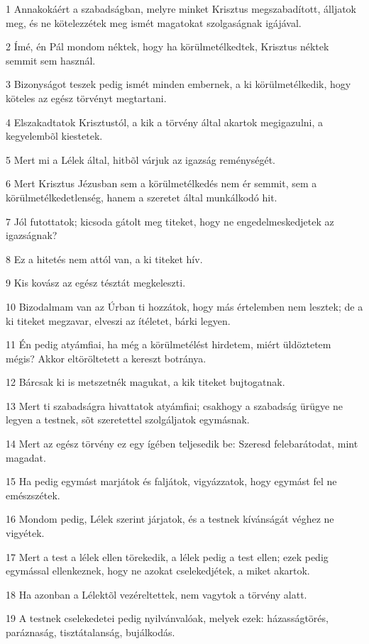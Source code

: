 \par 1 Annakokáért a szabadságban, melyre minket Krisztus megszabadított, álljatok meg, és ne kötelezzétek meg ismét magatokat szolgaságnak igájával.
\par 2 Ímé, én Pál mondom néktek, hogy ha körülmetélkedtek, Krisztus néktek semmit sem használ.
\par 3 Bizonyságot teszek pedig ismét minden embernek, a ki körülmetélkedik, hogy köteles az egész törvényt megtartani.
\par 4 Elszakadtatok Krisztustól, a kik a törvény által akartok megigazulni, a kegyelembõl kiestetek.
\par 5 Mert mi a Lélek által, hitbõl várjuk az igazság reménységét.
\par 6 Mert Krisztus Jézusban sem a körülmetélkedés nem ér semmit, sem a körülmetélkedetlenség, hanem a szeretet által munkálkodó  hit.
\par 7 Jól futottatok; kicsoda gátolt meg titeket, hogy ne engedelmeskedjetek az igazságnak?
\par 8 Ez a hitetés nem attól van, a ki titeket hív.
\par 9 Kis kovász az egész tésztát megkeleszti.
\par 10 Bizodalmam van az Úrban ti hozzátok, hogy más értelemben nem lesztek; de a ki titeket megzavar, elveszi az ítéletet, bárki legyen.
\par 11 Én pedig atyámfiai, ha még a körülmetélést hirdetem, miért üldöztetem mégis? Akkor eltöröltetett a kereszt botránya.
\par 12 Bárcsak ki is metszetnék magukat, a kik titeket bujtogatnak.
\par 13 Mert ti szabadságra hivattatok atyámfiai; csakhogy a szabadság ürügye ne legyen a testnek, sõt szeretettel szolgáljatok egymásnak.
\par 14 Mert az egész törvény ez egy ígében teljesedik be: Szeresd felebarátodat, mint magadat.
\par 15 Ha pedig egymást marjátok és faljátok, vigyázzatok, hogy egymást fel ne emészszétek.
\par 16 Mondom pedig, Lélek szerint járjatok, és a testnek kívánságát véghez ne vigyétek.
\par 17 Mert a test a lélek ellen törekedik, a lélek pedig a test ellen; ezek pedig egymással ellenkeznek, hogy ne azokat cselekedjétek, a miket akartok.
\par 18 Ha azonban a Lélektõl vezéreltettek, nem vagytok a törvény alatt.
\par 19 A testnek cselekedetei pedig nyilvánvalóak, melyek ezek: házasságtörés, paráznaság, tisztátalanság, bujálkodás.

